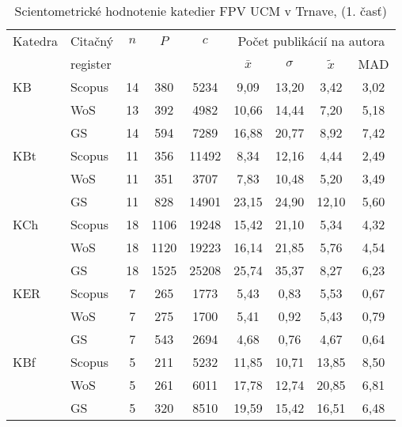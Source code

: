 \begin{table}
  \centering\small
  \caption[Hodnotenie FPV\,--\,počet publikácií na autora]{Scientometrické hodnotenie katedier FPV UCM v Trnave, (1. časť)}
  \label{tab:1-staff.results}
  \begin{tabular}{llccccccc}
  \toprule\noalign{\vspace{.3ex}}
 Katedra & Citačný   & $n$  & $P$    & $c$     & \multicolumn{4}{c}{Počet publikácií na autora}  \\
      & register  &    &      &       & $\bar{x}$      & $\sigma$  & $\tilde{x}$   & MAD  \\[0.3ex]
  \midrule\noalign{\vspace{.5ex}}                                                                                                                         
 KB   & Scopus & 14 & 380  & 5234  & 9,09          & 13,20 & 3,42  & 3,02 \\
      & WoS    & 13 & 392  & 4982  & 10,66         & 14,44 & 7,20  & 5,18 \\
      & GS     & 14 & 594  & 7289  & 16,88         & 20,77 & 8,92  & 7,42 \\[1ex]
 KBt  & Scopus & 11 & 356  & 11492 & 8,34          & 12,16 & 4,44  & 2,49 \\
      & WoS    & 11 & 351  & 3707  & 7,83          & 10,48 & 5,20  & 3,49 \\
      & GS     & 11 & 828  & 14901 & 23,15         & 24,90 & 12,10 & 5,60 \\[1ex]
 KCh  & Scopus & 18 & 1106 & 19248 & 15,42         & 21,10 & 5,34  & 4,32 \\
      & WoS    & 18 & 1120 & 19223 & 16,14         & 21,85 & 5,76  & 4,54 \\
      & GS     & 18 & 1525 & 25208 & 25,74         & 35,37 & 8,27  & 6,23 \\[1ex]
 KER  & Scopus & 7  & 265  & 1773  & 5,43          & 0,83  & 5,53  & 0,67 \\
      & WoS    & 7  & 275  & 1700  & 5,41          & 0,92  & 5,43  & 0,79 \\
      & GS     & 7  & 543  & 2694  & 4,68          & 0,76  & 4,67  & 0,64 \\[1ex]
 KBf  & Scopus & 5  & 211  & 5232  & 11,85         & 10,71 & 13,85 & 8,50 \\
      & WoS    & 5  & 261  & 6011  & 17,78         & 12,74 & 20,85 & 6,81 \\
      & GS     & 5  & 320  & 8510  & 19,59         & 15,42 & 16,51 & 6,48 \\[1ex]

\end{tabular}
\end{table}
